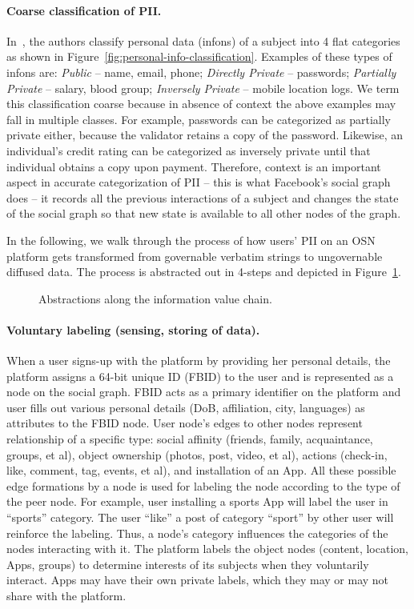 \documentclass[runningheads]{llncs}
\begin{document}
\paragraph{Coarse classification of PII.}
In~\cite{inverse-privacy}, the authors classify personal data (infons)
of a subject into 4 flat categories as shown in
Figure~\ref{fig:personal-info-classification}. Examples of these types
of infons are: \textit{Public} -- name, email, phone; \textit{Directly
  Private} -- passwords; \textit{Partially Private} -- salary, blood
group; \textit{Inversely Private} -- mobile location logs. We term
this classification coarse because in absence of context the above
examples may fall in multiple classes. For example, passwords can be
categorized as partially private either, because the validator retains
a copy of the password. Likewise, an individual's credit rating can be
categorized as inversely private until that individual obtains a copy
upon payment. Therefore, context is an important aspect in accurate
categorization of PII -- this is what Facebook's social graph does --
it records all the previous interactions of a subject and changes the
state of the social graph so that new state is available to all other
nodes of the graph.

In the following, we walk through the process of how users' PII on an
OSN platform gets transformed from governable verbatim strings to
ungovernable diffused data. The process is abstracted out in 4-steps
and depicted in Figure~\ref{fig:data-life-cycle}.
%
\begin{figure}[!h]
  \centering
  {}
  \caption{Abstractions along the information value chain.}
  \label{fig:data-life-cycle}
\end{figure}
%
\paragraph{Voluntary labeling (sensing, storing of data).} When a user
signs-up with the platform by providing her personal details, the
platform assigns a 64-bit unique ID (FBID) to the user and is
represented as a node on the social graph. FBID acts as a primary
identifier on the platform and user fills out various personal details
(DoB, affiliation, city, languages) as attributes to the FBID
node. User node's edges to other nodes represent relationship of a
specific type: social affinity (friends, family, acquaintance, groups,
et al), object ownership (photos, post, video, et al), actions
(check-in, like, comment, tag, events, et al), and installation of an
App. All these possible edge formations by a node is used for labeling
the node according to the type of the peer node. For example, user
installing a sports App will label the user in ``sports''
category. The user ``like'' a post of category ``sport'' by other user
will reinforce the labeling. Thus, a node's category influences the
categories of the nodes interacting with it. The platform labels the
object nodes (content, location, Apps, groups) to determine interests
of its subjects when they voluntarily interact. Apps may have their
own private labels, which they may or may not share with the platform.
\end{document}
